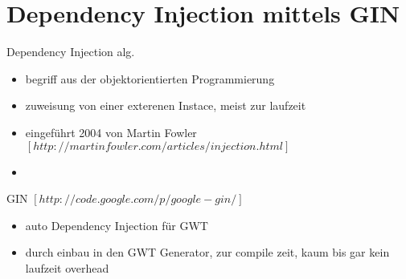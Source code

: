 \section{Dependency Injection mittels GIN} \label{GIN}
Dependency Injection alg.
\begin{itemize}  
  \item begriff aus der objektorientierten Programmierung
  \item zuweisung von einer exterenen Instace, meist zur laufzeit
  \item eingeführt 2004 von Martin Fowler\\
  $[http://martinfowler.com/articles/injection.html]$
  \item 
\end{itemize}
GIN $[http://code.google.com/p/google-gin/]$
\begin{itemize} 
  \item auto Dependency Injection für GWT
  \item durch einbau in den GWT Generator, zur compile zeit, kaum bis gar kein
  laufzeit overhead
\end{itemize}